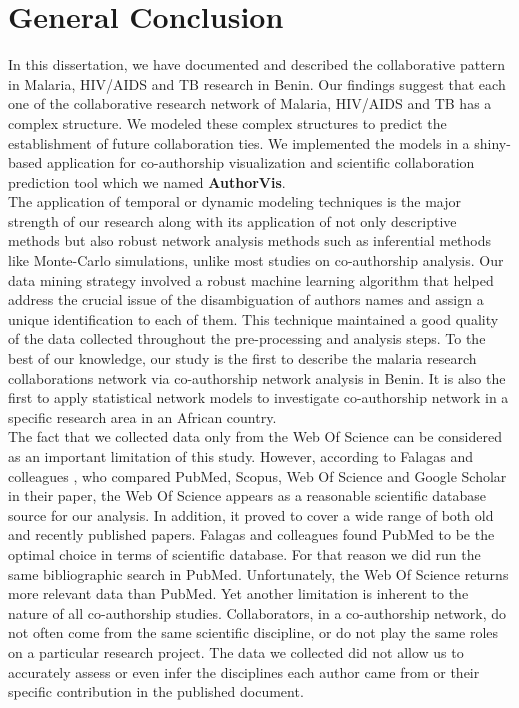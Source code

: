 
\clearpage  %
\chapter*{General Conclusion}
In this dissertation, we have documented and described the collaborative pattern in Malaria, HIV/AIDS and TB research in Benin. Our findings suggest that each one of the collaborative research network of Malaria, HIV/AIDS and TB has a complex structure. We modeled these complex structures to predict the establishment of future collaboration ties. We implemented the models in a shiny-based application for co-authorship visualization and scientific collaboration prediction tool which we named \textbf{AuthorVis}.\\
The application of temporal or dynamic modeling techniques is the major strength of our research along with its application of not only descriptive methods but also robust network analysis methods such as inferential methods like Monte-Carlo simulations, unlike most studies on co-authorship analysis. Our data mining strategy involved a robust machine learning algorithm that helped address the crucial issue of the disambiguation of authors names and assign a unique identification to each of them. This technique maintained a good quality of the data collected throughout the pre-processing and analysis steps. To the best of our knowledge, our study is the first to describe the malaria research collaborations network via co-authorship network analysis in Benin. It is also the first to apply statistical network models to investigate co-authorship network in a specific research area in an African country.\\%
The fact that we collected data only from the Web Of Science can be considered as an important limitation of this study. However, according to Falagas and colleagues \cite{falagas_comparison_2007}, who compared PubMed, Scopus, Web Of Science and Google Scholar in their paper, the Web Of Science appears as a reasonable scientific database source for our analysis. In addition, it proved to cover a wide range of both old and recently published papers. Falagas and colleagues \cite{falagas_comparison_2007} found PubMed to be the optimal choice in terms of scientific database. For that reason we did run the same bibliographic search in PubMed. Unfortunately, the Web Of Science returns more relevant data than PubMed. Yet another limitation is inherent to the nature of all co-authorship studies. Collaborators, in a co-authorship network, do not often come from the same scientific discipline, or do not play the same roles on a particular research project. The data we collected did not allow us to accurately assess or even infer the disciplines each author came from or their specific contribution in the published document.

